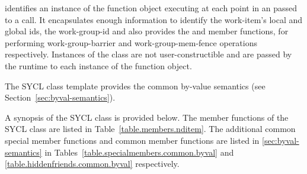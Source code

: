  identifies an instance of the function object
executing at each point in an  passed to a
 call. It encapsulates enough
information to identify the \gls{work-item}'s local and global \glspl{id}, the
\gls{work-group-id} and also provides the  and  member functions, for performing \gls{work-group-barrier} and \gls{work-group-mem-fence} operations respectively. Instances of the  class are not
user-constructible and are passed by the runtime to each instance of the
function object.

The SYCL  class template provides the common by-value
semantics (see Section~\ref{sec:byval-semantics}).

A synopsis of the SYCL  class is provided below. The member functions of the SYCL  class are listed in Table~\ref{table.members.nditem}. The additional common special member functions and common member functions are listed in \ref{sec:byval-semantics} in Tables~\ref{table.specialmembers.common.byval} and \ref{table.hiddenfriends.common.byval} respectively.


